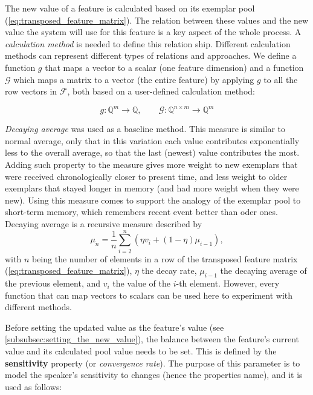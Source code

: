 The new value of a feature is calculated based on its exemplar pool (\cref{eq:transposed_feature_matrix}).
The relation between these values and the new value the system will use for this feature is a key aspect of the whole process.
A \textit{calculation method} is needed to define this relation ship.
Different calculation methods can represent different types of relations and approaches.
We define a function $g$ that maps a vector to a scalar (one feature dimension) and a function $\mathcal{G}$ which maps a matrix to a vector (the entire feature) by applying $g$ to all the row vectors in $\mathcal{F}$, both based on a user-defined calculation method:

\begin{equation}
\label{eq:matrix2vec}
g: \mathbb{Q}^{m} \longrightarrow \mathbb{Q}, \qquad \mathcal{G}: \mathbb{Q}^{n \times m} \longrightarrow \mathbb{Q}^{m} 
\end{equation}

\textit{Decaying average} was used as a baseline method.
This measure is similar to normal average, only that in this variation each value contributes exponentially less to the overall average, so that the last (newest) value contributes the most.
Adding such property to the measure gives more weight to new exemplars that were received chronologically closer to present time, and less weight to older exemplars that stayed longer in memory (and had more weight when they were new).
Using this measure comes to support the analogy of the exemplar pool to short-term memory, which remembers recent event better than oder ones.
Decaying average is a recursive measure described by
\begin{equation}
\label{eq:decaying_average}
\mu_n = \frac{1}{n}\sum_{i = 2}^{n}(\eta v_i + (1 - \eta )\mu_{i-1}),
\end{equation}
%
with $n$ being the number of elements in a row of the transposed feature matrix (\cref{eq:transposed_feature_matrix}), $\eta$ the decay rate, $\mu_{i-1}$ the decaying average of the previous element, and $v_i$ the value of the $i$-th element.
However, every function that can map vectors to scalars can be used here to experiment with different methods.

Before setting the updated value as the feature's value (see \cref{subsubsec:setting_the_new_value}), the balance between the feature's current value and its calculated pool value needs to be set.
This is defined by the \textbf{sensitivity} property (or \textit{convergence rate}).
The purpose of this parameter is to model the speaker's sensitivity to changes (hence the properties name), and it is used as follows:

